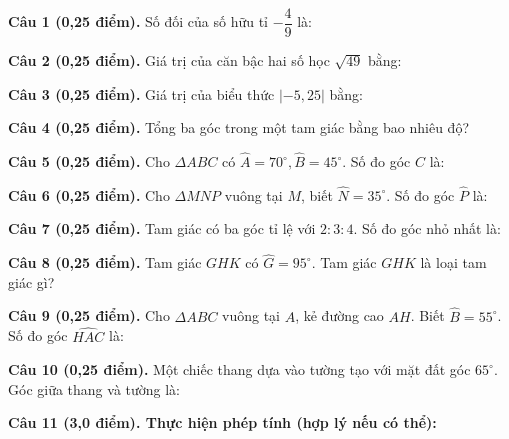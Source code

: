\documentclass[12pt,a4paper]{article}
\begin{document}
\vspace{1.5mm}
\noindent\textbf{Câu 1 (0,25 điểm).} Số đối của số hữu tỉ $-\dfrac{4}{9}$ là: \par\vspace{2.3mm}
\noindent\textbf{Câu 2 (0,25 điểm).} Giá trị của căn bậc hai số học $\sqrt{49}$ bằng: \par\vspace{2.3mm}
\noindent\textbf{Câu 3 (0,25 điểm).} Giá trị của biểu thức $|-5{,}25|$ bằng: \par\vspace{2.3mm}
\noindent\textbf{Câu 4 (0,25 điểm).} Tổng ba góc trong một tam giác bằng bao nhiêu độ? \par\vspace{2.3mm}
\noindent\textbf{Câu 5 (0,25 điểm).} Cho $\Delta ABC$ có $\widehat{A} = 70^\circ, \widehat{B} = 45^\circ$. Số đo góc $\widehat{C}$ là: \par\vspace{2.3mm}
\noindent\textbf{Câu 6 (0,25 điểm).} Cho $\Delta MNP$ vuông tại $M$, biết $\widehat{N} = 35^\circ$. Số đo góc $\widehat{P}$ là: \par\vspace{2.3mm}
\noindent\textbf{Câu 7 (0,25 điểm).} Tam giác có ba góc tỉ lệ với $2 : 3 : 4$. Số đo góc nhỏ nhất là: \par\vspace{2.3mm}
\noindent\textbf{Câu 8 (0,25 điểm).} Tam giác $GHK$ có $\widehat{G} = 95^\circ$. Tam giác $GHK$ là loại tam giác gì? \par\vspace{2.3mm}
\noindent\textbf{Câu 9 (0,25 điểm).} Cho $\Delta ABC$ vuông tại $A$, kẻ đường cao $AH$. Biết $\widehat{B} = 55^\circ$. Số đo góc $\widehat{HAC}$ là: \par\vspace{2.3mm}
\noindent\textbf{Câu 10 (0,25 điểm).} Một chiếc thang dựa vào tường tạo với mặt đất góc $65^\circ$. Góc giữa thang và tường là: \par\vspace{2.3mm}
\vspace{0.2mm}
\noindent\textbf{Câu 11 (3,0 điểm). Thực hiện phép tính (hợp lý nếu có thể):}
\vspace{0.8mm}
\end{document}
